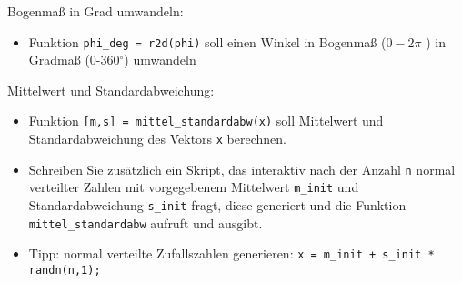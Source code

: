   \secMexercise
  \begin{frame}
      \frameMexercise
      \begin{exercise}
          \sloppy
          Bogenmaß in Grad umwandeln:
          \begin{itemize}
            \item Funktion \texttt{phi\_deg = r2d(phi)} soll einen Winkel in Bogenmaß ($0-2\pi$ ) in Gradmaß (0-360$^{\circ}$) umwandeln
          \end{itemize}
      \end{exercise}
  \end{frame}

  \secMexercise
  \begin{frame}
      \frameMexercise
      \begin{exercise}
          \sloppy
          Mittelwert und Standardabweichung:
          \begin{itemize}
            \item Funktion \texttt{[m,s] = mittel\_standardabw(x)} soll Mittelwert und Standardabweichung des Vektors \texttt{x} berechnen.
            \item Schreiben Sie zusätzlich ein Skript, das interaktiv nach der Anzahl \texttt{n} normal verteilter Zahlen mit vorgegebenem
            Mittelwert \texttt{m\_init} und Standardabweichung \texttt{s\_init} fragt, diese generiert und die Funktion
            \texttt{mittel\_standardabw} aufruft und ausgibt.
            \item Tipp: normal verteilte Zufallszahlen generieren: \texttt{x = m\_init + s\_init * randn(n,1);}
          \end{itemize}
      \end{exercise}
  \end{frame}

